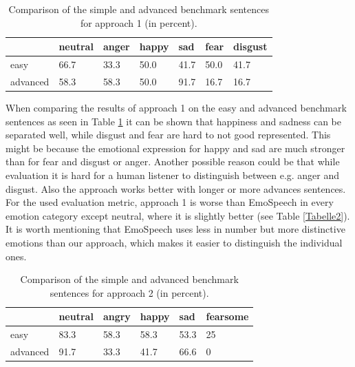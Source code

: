 \documentclass[11pt]{article}
\begin{document}
\begin{table}[h]

\small
\vspace{5px}
{
\begin{tabular}{|p{0.9cm}|p{0.65cm}|p{0.65cm}|p{0.65cm}|p{0.65cm}|p{0.65cm}|p{0.65cm}|}
\hline
\rowcolor{mintgreen}&neutral&anger&happy&sad&fear&disgust\\
\hline
\cellcolor{gainsboro}easy&66.7&33.3&50.0&41.7&50.0&41.7\\
\hline
\cellcolor{gainsboro}advanced&58.3&58.3&50.0&91.7&16.7&16.7\\
\hline
\end{tabular}
}

\caption{Comparison of the simple and advanced benchmark sentences for approach 1 (in percent).}
\label{Tabelle3}
\end{table}
When comparing the results of approach 1 on the easy and advanced benchmark sentences as seen in Table \ref{Tabelle3} it can be shown that happiness and sadness can be separated well, while disgust and fear are hard to not good represented. This might be because the  emotional expression for happy and sad are much stronger than for fear and disgust or anger. Another possible reason could be that while evaluation it is hard for a human listener to distinguish between e.g. anger and disgust. Also the approach works better with longer or more advances sentences. \\   
For the used evaluation metric, approach 1 is worse than EmoSpeech \cite{diatlova_emospeech_2023} in every emotion category except neutral, where it is slightly better (see Table \ref{Tabelle2}). It is worth mentioning that EmoSpeech uses less in number but more distinctive emotions than our approach, which makes it easier to distinguish the individual ones. 

\begin{table}[h]

\small
\vspace{5px}
{
\begin{tabular}{|l|l|l|l|l|l|}
\hline
\rowcolor{mintgreen}&neutral&angry&happy&sad&fearsome\\
\hline
\cellcolor{gainsboro}easy&83.3&58.3&58.3&53.3&25\\
\hline
\cellcolor{gainsboro}advanced&91.7&33.3&41.7&66.6&0\\
\hline
\end{tabular}
}

\caption{Comparison of the simple and advanced benchmark sentences for approach 2 (in percent).}
\label{Tabelle4}
\end{table}
\end{document}
